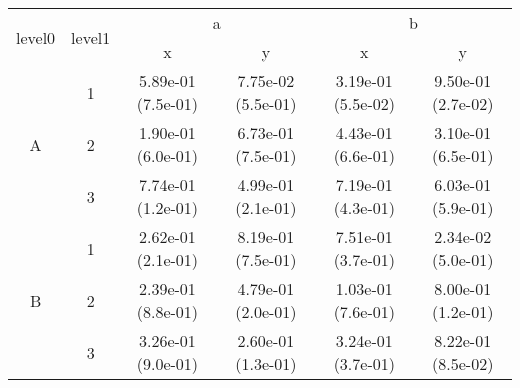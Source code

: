 \begin{tabular}{cccccc}
\toprule
\multirow{2}{*}{level0} & \multirow{2}{*}{level1}&\multicolumn{2}{c}{a}&\multicolumn{2}{c}{b}\tabularnewline
\cmidrule(lr){3-4}
\cmidrule(lr){5-6}
&&x&y&x&y\tabularnewline
\midrule
\multirow{3}{*}{A}&1& 5.89e-01 (7.5e-01)& 7.75e-02 (5.5e-01)& 3.19e-01 (5.5e-02)& 9.50e-01 (2.7e-02)\tabularnewline
&2& 1.90e-01 (6.0e-01)& 6.73e-01 (7.5e-01)& 4.43e-01 (6.6e-01)& 3.10e-01 (6.5e-01)\tabularnewline
&3& 7.74e-01 (1.2e-01)& 4.99e-01 (2.1e-01)& 7.19e-01 (4.3e-01)& 6.03e-01 (5.9e-01)\tabularnewline
\midrule
\multirow{3}{*}{B}&1& 2.62e-01 (2.1e-01)& 8.19e-01 (7.5e-01)& 7.51e-01 (3.7e-01)& 2.34e-02 (5.0e-01)\tabularnewline
&2& 2.39e-01 (8.8e-01)& 4.79e-01 (2.0e-01)& 1.03e-01 (7.6e-01)& 8.00e-01 (1.2e-01)\tabularnewline
&3& 3.26e-01 (9.0e-01)& 2.60e-01 (1.3e-01)& 3.24e-01 (3.7e-01)& 8.22e-01 (8.5e-02)\tabularnewline
\bottomrule
\end{tabular}
